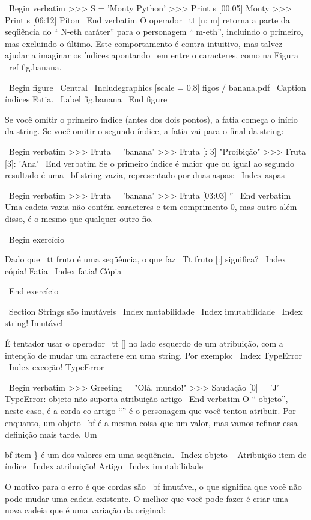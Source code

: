 \documentclass[10pt]{book}
\begin{document}
{{{{\ Begin {verbatim}
>>> S = 'Monty Python'
>>> Print s [00:05]
Monty
>>> Print s [06:12]
Píton
\ End {verbatim}
%
O operador {\ tt [n: m]} retorna a parte da seqüência do 
`` N-eth caráter'' para o personagem `` m-eth'', incluindo o primeiro, mas
excluindo o último. Este comportamento é contra-intuitivo, mas talvez
ajudar a imaginar os índices apontando {\ em} entre o
caracteres, como na Figura ~ \ ref {} fig.banana.

\ Begin {figure}
\ Central
{\ Includegraphics [scale = 0.8] {figos / banana.pdf}}
\ Caption {índices Fatia.}
\ Label {} fig.banana
\ End {figure}


Se você omitir o primeiro índice (antes dos dois pontos), a fatia começa
o início da string. Se você omitir o segundo índice, a fatia
vai para o final da string:

\ Begin {verbatim}
>>> Fruta = 'banana'
>>> Fruta [: 3]
"Proibição"
>>> Fruta [3]:
'Ana'
\ End {verbatim}
%
Se o primeiro índice é maior que ou igual ao segundo resultado
é uma {\ bf string vazia}, representado por duas aspas:
\ Index {aspas}

\ Begin {verbatim}
>>> Fruta = 'banana'
>>> Fruta [03:03]
''
\ End {verbatim}
%
Uma cadeia vazia não contém caracteres e tem comprimento 0, mas outro
além disso, é o mesmo que qualquer outro fio.

\ Begin {} exercício

Dado que {\ tt fruto} é uma seqüência, o que faz
{\ Tt fruto [:]} significa?
\ Index {cópia! Fatia}
\ Index {fatia! Cópia}

\ End {} exercício


\ Section {Strings são imutáveis}
\ Index {} mutabilidade
\ Index {imutabilidade}
\ Index {string! Imutável}

É tentador usar o operador {\ tt []} no lado esquerdo de um
atribuição, com a intenção de mudar um caractere em uma string.
Por exemplo:
\ Index {} TypeError
\ Index {exceção! TypeError}

\ Begin {verbatim}
>>> Greeting = "Olá, mundo!"
>>> Saudação [0] = 'J'
TypeError: objeto não suporta atribuição artigo
\ End {verbatim}
%
O `` objeto'', neste caso, é a corda eo artigo ``'' é
o personagem que você tentou atribuir. Por enquanto, um objeto {\ bf} é
a mesma coisa que um valor, mas vamos refinar essa definição
mais tarde. Um {bf item \} é um dos valores em uma seqüência.
\ Index {objeto}
\ {} Atribuição item de índice
\ Index {atribuição! Artigo}
\ Index {imutabilidade}

O motivo para o erro é que
cordas são {\ bf} imutável, o que significa que você não pode mudar uma
cadeia existente. O melhor que você pode fazer é criar uma nova cadeia
que é uma variação da original:

}}}}}
\end{document}
